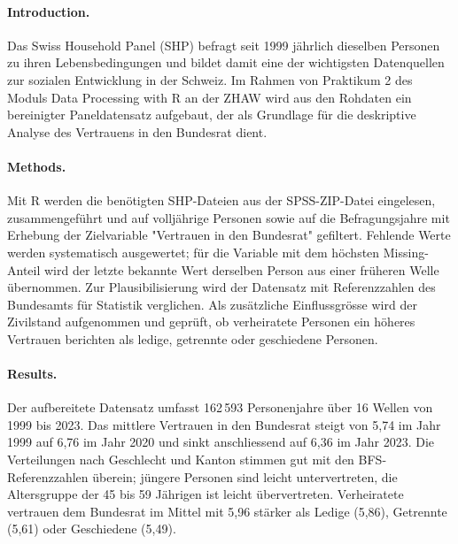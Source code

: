 

\begin{extraAbstract}
\addchaptertocentry{\extraabstractname}

\paragraph{Introduction.}
Das Swiss Household Panel (SHP) befragt seit 1999 jährlich dieselben Personen zu ihren
Lebensbedingungen und bildet damit eine der wichtigsten Datenquellen zur sozialen
Entwicklung in der Schweiz. Im Rahmen von Praktikum 2 des Moduls Data Processing with R
an der ZHAW wird aus den Rohdaten ein bereinigter Paneldatensatz aufgebaut, der als
Grundlage für die deskriptive Analyse des Vertrauens in den Bundesrat dient.

\paragraph{Methods.}
Mit R werden die benötigten SHP-Dateien aus der SPSS-ZIP-Datei eingelesen,
zusammengeführt und auf volljährige Personen sowie auf die Befragungsjahre mit
Erhebung der Zielvariable "Vertrauen in den Bundesrat" gefiltert. Fehlende Werte
werden systematisch ausgewertet; für die Variable mit dem höchsten Missing-Anteil wird
der letzte bekannte Wert derselben Person aus einer früheren Welle übernommen. Zur
Plausibilisierung wird der Datensatz mit Referenzzahlen des Bundesamts für Statistik 
verglichen. Als zusätzliche Einflussgrösse wird der Zivilstand
aufgenommen und geprüft, ob verheiratete Personen ein höheres Vertrauen
berichten als ledige, getrennte oder geschiedene Personen.

\paragraph{Results.}
Der aufbereitete Datensatz umfasst 162\,593 Personenjahre über 16 Wellen von 1999 bis
2023. Das mittlere Vertrauen in den Bundesrat steigt von 5{,}74 im Jahr 1999 auf 6{,}76
im Jahr 2020 und sinkt anschliessend auf 6{,}36 im Jahr 2023. Die Verteilungen nach
Geschlecht und Kanton stimmen gut mit den BFS-Referenzzahlen überein; jüngere Personen
sind leicht untervertreten, die Altersgruppe der 45 bis 59 Jährigen ist leicht
übervertreten. Verheiratete vertrauen dem Bundesrat im Mittel mit 5{,}96 stärker als
Ledige (5{,}86), Getrennte (5{,}61) oder Geschiedene (5{,}49).


\end{extraAbstract}
